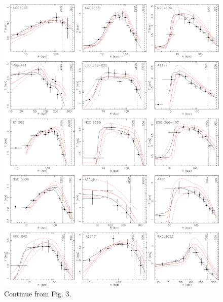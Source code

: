 \documentclass{aastex}
\begin{document}
\begin{figure}
\centerline{\includegraphics[height=1.25\linewidth]{f4.eps}}
  \caption{Continue from Fig. 3.
}
\end{figure}
\clearpage
\end{document}
